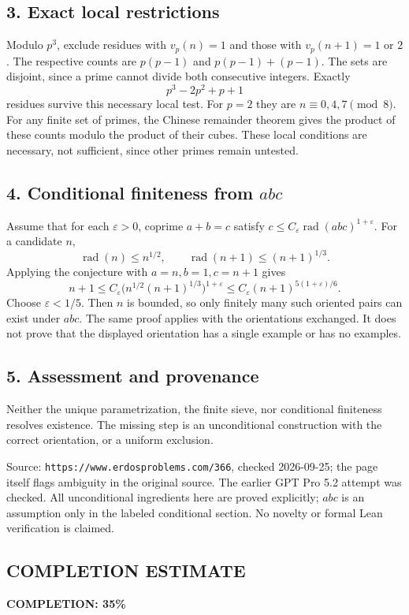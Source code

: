 \subsection*{3. Exact local restrictions}
Modulo $p^3$, exclude residues with $v_p(n)=1$ and those with
$v_p(n+1)=1$ or $2$. The respective counts are
$p(p-1)$ and $p(p-1)+(p-1)$. The sets are disjoint, since a prime
cannot divide both consecutive integers. Exactly
\[
 p^3-2p^2+p+1
\]
residues survive this necessary local test. For $p=2$ they are
$n\equiv0,4,7\pmod8$. For any finite set of primes, the Chinese
remainder theorem gives the product of these counts modulo the
product of their cubes. These local conditions are necessary,
not sufficient, since other primes remain untested.

\subsection*{4. Conditional finiteness from $abc$}
Assume that for each $\varepsilon>0$, coprime $a+b=c$ satisfy
$c\le C_\varepsilon\operatorname{rad}(abc)^{1+\varepsilon}$.
For a candidate $n$,
\[
 \operatorname{rad}(n)\le n^{1/2},\qquad
 \operatorname{rad}(n+1)\le(n+1)^{1/3}.
\]
Applying the conjecture with $a=n,b=1,c=n+1$ gives
\[
 n+1\le C_\varepsilon
       \big(n^{1/2}(n+1)^{1/3}\big)^{1+\varepsilon}
 \le C_\varepsilon(n+1)^{5(1+\varepsilon)/6}.
\]
Choose $\varepsilon<1/5$. Then $n$ is bounded, so only finitely many
such oriented pairs can exist under $abc$. The same proof applies
with the orientations exchanged. It does not prove that the
displayed orientation has a single example or has no examples.

\subsection*{5. Assessment and provenance}
Neither the unique parametrization, the finite sieve, nor conditional
finiteness resolves existence. The missing step is an unconditional
construction with the correct orientation, or a uniform exclusion.

Source: \texttt{https://www.erdosproblems.com/366}, checked 2026-09-25;
the page itself flags ambiguity in the original source.
The earlier GPT Pro 5.2 attempt was checked. All unconditional
ingredients here are proved explicitly; $abc$ is an assumption
only in the labeled conditional section.
No novelty or formal Lean verification is claimed.
\subsection*{COMPLETION ESTIMATE}
\textbf{COMPLETION: 35\%}
